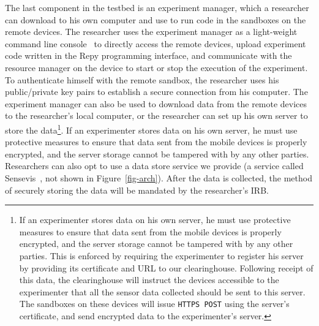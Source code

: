 The last component in the testbed is an experiment manager, which a 
researcher can download to his own computer and use to run code in 
the sandboxes on the remote devices. 
The researcher uses the experiment manager as a light-weight command line 
console~\cite{demo-kit} to directly access the remote devices, upload 
experiment code written in the Repy programming interface, and
communicate with the resource manager on the device to start 
or stop the execution of the experiment. To authenticate himself with 
the remote sandbox, the researcher uses 
his public/private key pairs to establish a secure connection from his
computer. The experiment manager can also be used to download data 
from the remote devices to the researcher's local computer, or
the researcher can set up his own server to store the data\footnote{\scriptsize
If an experimenter stores data on his own server, he must use protective
measures to ensure that data sent from the mobile devices is
properly encrypted, and the server storage cannot be tampered
with by any other parties. This is enforced by requiring the experimenter to register
his server by providing its certificate and URL to our
clearinghouse. Following receipt of this data, the clearinghouse will instruct the devices
accessible to the experimenter that all the sensor data collected should be
sent to this server. The sandboxes on these devices will issue
\texttt{HTTPS POST} using the server's certificate, and send encrypted
data to the experimenter's server.}. 
If an experimenter stores data on his own server, he must use protective
measures to ensure that data sent from the mobile devices is
properly encrypted, and the server storage cannot be tampered
with by any other parties. Researchers can also opt to use a data 
store service we provide (a service called Sensevis~\cite{sensevis}, 
not shown in Figure~\ref{fig-arch}). After the data is collected, the method of 
securely storing the data will be mandated by the researcher's IRB.

